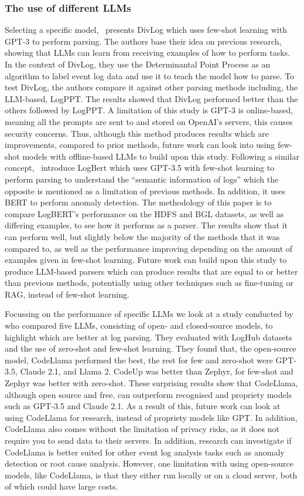 \subsubsection{The use of different LLMs}
Selecting a specific model,~\cite{xu2024divlog} presents DivLog which uses few-shot learning with GPT-3 to perform parsing. The authors base their idea on previous research, showing that LLMs can learn from receiving examples of how to perform tasks. In the context of DivLog, they use the Determinantal Point Process as an algorithm to label event log data and use it to teach the model how to parse. To test DivLog, the authors compare it against other parsing methods including, the LLM-based, LogPPT. The results showed that DivLog performed better than the others followed by LogPPT. A limitation of this study is GPT-3 is online-based, meaning all the prompts are sent to and stored on OpenAI's servers, this causes security concerns. Thus, although this method produces results which are improvements, compared to prior methods, future work can look into using few-shot models with offline-based LLMs to build upon this study. Following a similar concept,~\cite{zhou2024leveraging} introduce LogBert which uses GPT-3.5 with few-shot learning to perform parsing to understand the ``semantic information of logs'' which the opposite is mentioned as a limitation of previous methods. In addition, it uses BERT to perform anomaly detection. The methodology of this paper is to compare LogBERT's performance on the HDFS and BGL datasets, as well as differing examples, to see how it performs as a parser. The results show that it can perform well, but slightly below the majority of the methods that it was compared to, as well as the performance improving depending on the amount of examples given in few-shot learning. Future work can build upon this study to produce LLM-based parsers which can produce results that are equal to or better than previous methods, potentially using other techniques such as fine-tuning or RAG, instead of few-shot learning.

Focussing on the performance of specific LLMs we look at a study conducted by~\cite{astekin2024comparative} who compared five LLMs, consisting of open- and closed-source models, to highlight which are better at log parsing. They evaluated with LogHub datasets and the use of zero-shot and few-shot learning. They found that, the open-source model, CodeLlama performed the best, the rest for few and zero-shot were GPT-3.5, Claude 2.1, and Llama 2. CodeUp was better than Zephyr, for few-shot and Zephyr was better with zero-shot. These surprising results show that CodeLlama, although open source and free, can outperform recognised and propriety models such as GPT-3.5 and Claude 2.1. As a result of this, future work can look at using CodeLlama for research, instead of propriety models like GPT. In addition, CodeLlama also comes without the limitation of privacy risks, as it does not require you to send data to their servers. In addition, research can investigate if CodeLlama is better suited for other event log analysis tasks such as anomaly detection or root cause analysis. However, one limitation with using open-source models, like CodeLlama, is that they either run locally or on a cloud server, both of which could have large costs.

